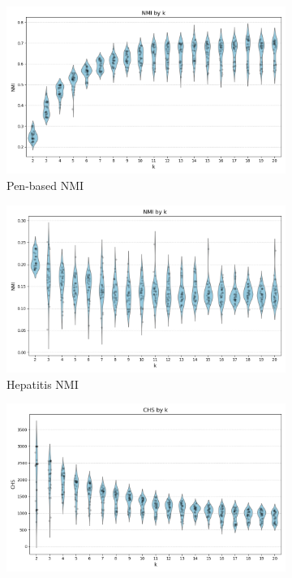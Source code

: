 \begin{figure}[H]
    \centering
    \begin{subfigure}{0.32\textwidth}
        \centering
        \includegraphics[width=\linewidth]{figures/KMeans/penbased_violin_k_vs_NMI.png}
        \caption{Pen-based NMI}
    \end{subfigure}
    \hfill
    \begin{subfigure}{0.32\textwidth}
        \centering
        \includegraphics[width=\linewidth]{figures/KMeans/hepatitis_violin_k_vs_NMI.png}
        \caption{Hepatitis NMI}
    \end{subfigure}
    \hfill
    \begin{subfigure}{0.32\textwidth}
        \centering
        \includegraphics[width=\linewidth]{figures/KMeans/mushroom_violin_k_vs_CHS.png}

\end{subfigure}
\end{figure}
